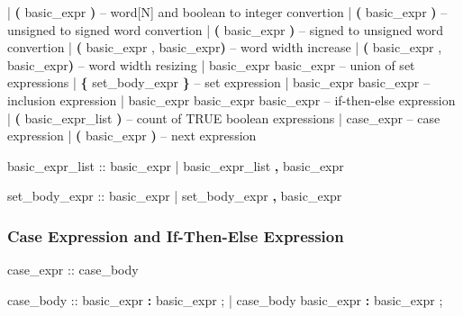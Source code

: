 \begin{Grammar}
      |  \textbf{(} basic_expr \textbf{)}  
                                 \footnotesize{-- word[N] and boolean to integer convertion}
      |  \textbf{(} basic_expr \textbf{)}
                                 \footnotesize{-- unsigned to signed word convertion}
      |  \textbf{(} basic_expr \textbf{)}
                                 \footnotesize{-- signed to unsigned word convertion}
      |  \textbf{(} basic_expr , basic_expr\textbf{)}  
                                 \footnotesize{-- word width increase}
      |  \textbf{(} basic_expr , basic_expr\textbf{)}  
                                 \footnotesize{-- word width resizing}
      | basic_expr  basic_expr 
                                 \footnotesize{-- union of set expressions }
      | \textbf{\{} set_body_expr \textbf{\}}            \footnotesize{-- set expression}
      | basic_expr  basic_expr   \footnotesize{-- inclusion expression}
      | basic_expr  basic_expr \operator{:} basic_expr  
                                 \footnotesize{-- if-then-else expression}
      |  \textbf{(} basic_expr_list \textbf{)} 
                       \footnotesize{-- count of TRUE boolean expressions}
      | case_expr                    \footnotesize{-- case expression}
      |  \textbf{(} basic_expr \textbf{)}       \footnotesize{-- next expression}

basic_expr_list ::
        basic_expr
      | basic_expr_list \textbf{,} basic_expr
\end{Grammar}
 

\begin{Grammar}
set_body_expr :: 
        basic_expr
      | set_body_expr \textbf{,} basic_expr
\end{Grammar}


\subsubsection{Case Expression and If-Then-Else Expression}
\begin{Grammar}
case_expr ::  case_body 

case_body ::
        basic_expr \textbf{:} basic_expr {;}
      | case_body basic_expr \textbf{:} basic_expr {;}
\end{Grammar}

